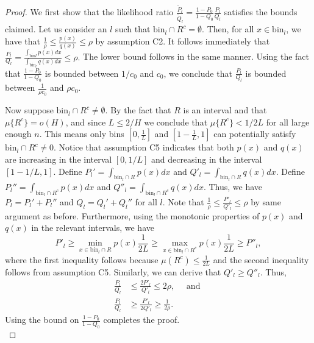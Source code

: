 \documentclass{article}
\newcommand{\bin}{\text{bin}}
\begin{document}
\begin{proof}
We first show that the likelihood ratio $\frac{\tilde P_l}{\tilde Q_l} = \frac{1-P_0}{1-Q_0} \frac{P_l}{Q_l}$ satisfies the bounds claimed. Let us consider an $l$ such that $\bin_l \cap R^c = \emptyset$. Then, for all $x \in \bin_l$, we have that 
$\frac{1}{\rho} \leq \frac{p(x)}{q(x)} \leq \rho$ by assumption C2. It follows immediately that $\frac{P_l}{Q_l} = \frac{\int_{\bin l} p(x)dx}{\int_{\bin_l} q(x)dx} \leq \rho.$ The lower bound follows in the same manner. Using the fact that $\frac{1-P_0}{1-Q_0}$ is bounded between $1/c_0$ and $c_0$, we conclude that $\frac{P_l}{Q_l}$ is bounded between $\frac{1}{\rho c_0}$ and $\rho c_0$.

Now suppose $\bin_l \cap R^c \neq \emptyset$. By the fact that $R$ is an interval and that $\mu\{R^c\} = o(H)$, and since $L \leq 2/H$ we conclude that $\mu\{R^c\} < 1/2L$ for all large enough $n$. This means only bins $[0, \frac{1}{L}]$ and $[1-\frac{1}{L}, 1]$ can potentially satisfy $\bin_l \cap R^c \neq 0$. Notice that assumption C5 indicates that both $p(x)$ and $q(x)$ are increasing in the interval $[0, 1/L]$ and decreasing in the interval $[1-1/L, 1]$. Define $P_l' = \int_{\bin_l \cap R} p(x) dx$ and $Q'_l = \int_{\bin_l \cap R} q(x) dx$. Define $P_l'' = \int_{\bin_l \cap R^c} p(x) dx$ and $Q''_l = \int_{\bin_l \cap R^c} q(x) dx$. Thus, we have $P_l = P_l' + P_l''$ and $Q_l = Q_l' + Q_l''$ for all $l$. Note  that $\frac{1}{\rho} \leq \frac{P'_l}{Q'_l} \leq \rho$ by same argument as before.  Furthermore, using the monotonic properties of $p(x)$ and $q(x)$ in the relevant intervals, we have
\[
P'_l \geq \min_{x \in \bin_l \cap R} p(x) \frac{1}{2L} \geq \max_{x \in \bin_l \cap R^c} p(x) \frac{1}{2L} \geq P''_l,
\]
where the first inequality follows because $\mu(R^c) \leq \frac{1}{2L}$ and the second inequality follows from assumption C5. Similarly, we can derive that $Q'_l \geq Q''_l$. Thus,
\begin{align*}
\frac{P_l}{Q_l} &\leq \frac{2 P'_l}{ Q'_l} \leq 2\rho, \quad \text{ and } \\
\frac{P_l}{Q_l} &\geq \frac{P'_l}{2 Q'_l} \geq \frac{1}{2\rho}.
\end{align*}
Using the bound on $\frac{1-P_0}{1-Q_0}$ completes the proof.\\


\end{proof}
\end{document}
